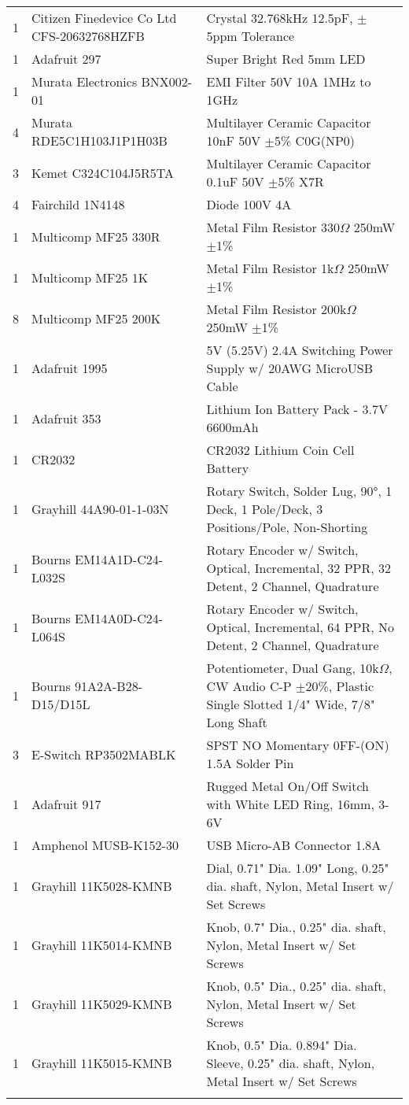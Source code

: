 \begin{longtabu}{X[1,c,m] X[6,c,m] X[9,l,m]}
  1 & Citizen Finedevice Co Ltd CFS-20632768HZFB & Crystal 32.768kHz 12.5pF, $\pm$5ppm Tolerance \\
  1 & Adafruit 297 & Super Bright Red 5mm LED \\
  1 & Murata Electronics BNX002-01 & EMI Filter 50V 10A 1MHz to 1GHz \\
  4 & Murata RDE5C1H103J1P1H03B & Multilayer Ceramic Capacitor 10nF 50V $\pm$5\% C0G(NP0) \\
  3 & Kemet C324C104J5R5TA & Multilayer Ceramic Capacitor 0.1uF 50V $\pm$5\% X7R \\
  4 & Fairchild 1N4148 & Diode 100V 4A \\
  1 & Multicomp MF25 330R & Metal Film Resistor 330$\Omega$ 250mW $\pm$1\% \\
  1 & Multicomp MF25 1K & Metal Film Resistor 1k$\Omega$ 250mW $\pm$1\% \\
  8 & Multicomp MF25 200K & Metal Film Resistor 200k$\Omega$ 250mW $\pm$1\% \\ \mrule

  1 & Adafruit 1995 & 5V (5.25V) 2.4A Switching Power Supply w/ 20AWG MicroUSB Cable \\
  1 & Adafruit 353 & Lithium Ion Battery Pack - 3.7V 6600mAh \\
  1 & CR2032 & CR2032 Lithium Coin Cell Battery \\ \mrule

  1 & Grayhill 44A90-01-1-03N & Rotary Switch, Solder Lug, 90°, 1 Deck, 1 Pole/Deck, 3 Positions/Pole, Non-Shorting \\
  1 & Bourns EM14A1D-C24-L032S & Rotary Encoder w/ Switch, Optical, Incremental, 32 PPR, 32 Detent, 2 Channel, Quadrature \\
  1 & Bourns EM14A0D-C24-L064S & Rotary Encoder w/ Switch, Optical, Incremental, 64 PPR, No Detent, 2 Channel, Quadrature \\
  1 & Bourns 91A2A-B28-D15/D15L & Potentiometer, Dual Gang, 10k$\Omega$, CW Audio C-P $\pm$20\%, Plastic Single Slotted 1/4" Wide, 7/8" Long Shaft \\
  3 & E-Switch RP3502MABLK & SPST NO Momentary 0FF-(ON) 1.5A Solder Pin \\
  1 & Adafruit 917 & Rugged Metal On/Off Switch with White LED Ring, 16mm, 3-6V \\
  1 & Amphenol MUSB-K152-30 & USB Micro-AB Connector 1.8A \\ \mrule

  1 & Grayhill 11K5028-KMNB & Dial, 0.71" Dia. 1.09" Long, 0.25" dia. shaft, Nylon, Metal Insert w/ Set Screws \\
  1 & Grayhill 11K5014-KMNB & Knob, 0.7" Dia., 0.25" dia. shaft, Nylon, Metal Insert w/ Set Screws \\
  1 & Grayhill 11K5029-KMNB & Knob, 0.5" Dia., 0.25" dia. shaft, Nylon, Metal Insert w/ Set Screws \\
  1 & Grayhill 11K5015-KMNB & Knob, 0.5" Dia. 0.894" Dia. Sleeve, 0.25" dia. shaft, Nylon, Metal Insert w/ Set Screws \\ \mrule


\end{longtabu}
